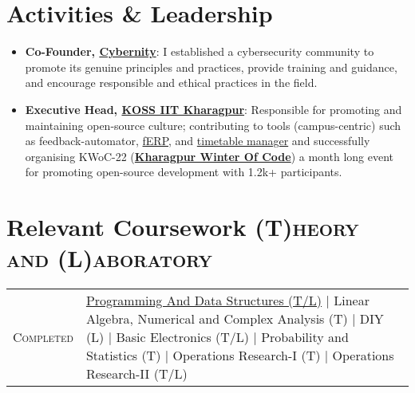\documentclass[a4paper,10pt]{extarticle} %
\begin{document}
\vspace{+0.2cm}
 \section{\textcolor{primary}{Activities \& Leadership}}
\vspace{+0.1cm}

\begin{itemize}[leftmargin=0.55cm, rightmargin=0.2cm, label={\Large\textbullet}]

\item \textbf{Co-Founder, \href{https://cybernity.org/}{Cybernity}}: I established a cybersecurity community to promote its genuine principles and practices, provide training and guidance, and encourage responsible and ethical practices in the field.

\item \textbf{Executive Head, \href{https://kossiitkgp.org/about/index.html}{KOSS IIT Kharagpur}}: Responsible for promoting and maintaining open-source culture; contributing to tools (campus-centric) such as feedback-automator, \href{https://github.com/proffapt/fERP}{fERP}, and \href{https://github.com/xypnox/gyft2}{timetable manager} and successfully organising KWoC-22 (\textbf{\href{https://kwoc.kossiitkgp.org/}{Kharagpur Winter Of Code}}) a month long event for promoting open-source development with 1.2k+ participants.

\end{itemize}

 \vspace{+0.2cm}
 \section{\textcolor{primary}{Relevant Coursework}
 \hfill\small\textsc{(T)heory and (L)aboratory}}
 \vspace{+0.1cm}

 \begin{tabular}{r|p{15cm}}
 \textsc{Completed} & \href{https://github.com/proffapt/iitkgp-pds-lab }{Programming And Data Structures (T/L)} | Linear Algebra, Numerical and Complex Analysis (T) | DIY (L) | Basic Electronics (T/L) | Probability and Statistics (T) | Operations Research-I (T) | Operations Research-II (T/L) \\
 \end{tabular}
\end{document}
